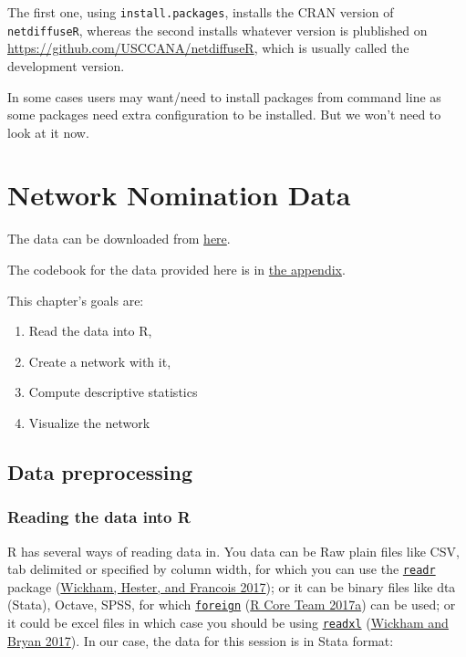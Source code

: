\documentclass[
]{book}
\begin{document}
The first one, using \texttt{install.packages}, installs the CRAN version of \texttt{netdiffuseR}, whereas the second installs whatever version is plublished on \url{https://github.com/USCCANA/netdiffuseR}, which is usually called the development version.

In some cases users may want/need to install packages from command line as some packages need extra configuration to be installed. But we won't need to look at it now.

\hypertarget{network-nomination-data}{%
\chapter{Network Nomination Data}\label{network-nomination-data}}

The data can be downloaded from \href{https://cdn.rawgit.com/gvegayon/appliedsnar/fdc0d26f/03-sns.dta}{here}.

The codebook for the data provided here is in \protect\hyperlink{sns-data}{the appendix}.

This chapter's goals are:

\begin{enumerate}
\def\labelenumi{\arabic{enumi}.}
\item
  Read the data into R,
\item
  Create a network with it,
\item
  Compute descriptive statistics
\item
  Visualize the network
\end{enumerate}

\hypertarget{data-preprocessing}{%
\section{Data preprocessing}\label{data-preprocessing}}

\hypertarget{reading-the-data-into-r}{%
\subsection{Reading the data into R}\label{reading-the-data-into-r}}

R has several ways of reading data in. You data can be Raw plain files like CSV, tab delimited or specified by column width, for which you can use the \href{https://cran.r-project.org/package=readr}{\texttt{readr}} package (\protect\hyperlink{ref-R-readr}{Wickham, Hester, and Francois 2017}); or it can be binary files like dta (Stata), Octave, SPSS, for which \href{https://cran.r-project.org/package=readr}{\texttt{foreign}} (\protect\hyperlink{ref-R-foreign}{R Core Team 2017a}) can be used; or it could be excel files in which case you should be using \href{https://cran.r-project.org/package=readxl}{\texttt{readxl}} (\protect\hyperlink{ref-R-readxl}{Wickham and Bryan 2017}). In our case, the data for this session is in Stata format:
\end{document}
